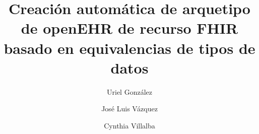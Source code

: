 \title{Creación automática de arquetipo de openEHR de recurso FHIR basado en equivalencias de tipos de datos}

\author{Uriel González}

\author{José Luis Vázquez}

\author{Cynthia Villalba}
